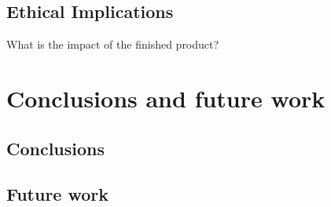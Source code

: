         \subsection{Ethical Implications}
            \begin{temp}
                What is the impact of the finished product?
            \end{temp}
    
    \section{Conclusions and future work} %
        \subsection{Conclusions}
        
        \subsection{Future work}
    
    
    \printbibliography[title={References},heading=bibintoc] %
    
    
    
